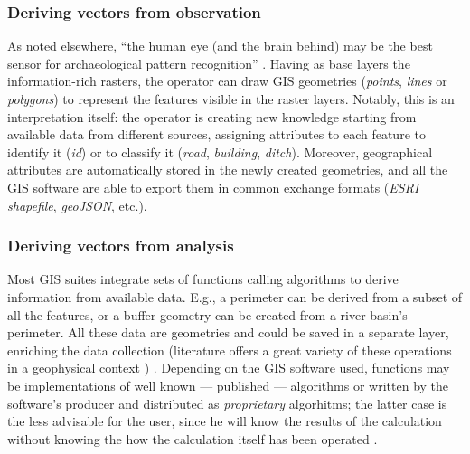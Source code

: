             \subsubsection{Deriving vectors from observation}
                As noted elsewhere, ``the human eye (and the brain behind) may be the best sensor for archaeological pattern recognition'' \cite[p.\ 164]{becker}. Having as base layers the information-rich rasters, the operator can draw GIS geometries (\emph{points}, \emph{lines} or \emph{polygons}) to represent the features visible in the raster layers. Notably, this is an interpretation itself: the operator is creating new knowledge starting from available data from different sources, assigning attributes to each feature to identify it (\emph{id}) or to classify it (\emph{road}, \emph{building}, \emph{ditch}). Moreover, geographical attributes are automatically stored in the newly created geometries, and all the GIS software are able to export them in common exchange formats (\emph{ESRI shapefile}, \emph{geoJSON}, etc.).

            \subsubsection{Deriving vectors from analysis}
                Most GIS suites integrate sets of functions calling algorithms to derive information from available data. E.g., a perimeter can be derived from a subset of all the features, or a buffer geometry can be created from a river basin's perimeter. All these data are geometries and could be saved in a separate layer, enriching the data collection (literature offers a great variety of these operations in a geophysical context \cite[p.~325]{remote-ciminale})
                \reversemarginpar
                . Depending on the GIS software used, functions may be implementations of well known --- published --- algorithms or written by the software's producer and distributed as \emph{proprietary} algorhitms; the latter case is the less advisable for the user, since he will know the results of the calculation without knowing the how the calculation itself has been operated \cite[p.~69]{fronza-informatica}.

